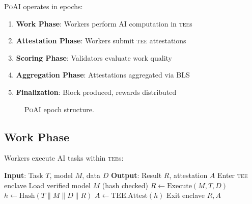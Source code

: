 \documentclass[11pt,letterpaper]{article}
\newcommand{\PoAI}{\textsc{PoAI}}
\newcommand{\TEE}{\textsc{tee}}
\begin{document}
\PoAI{} operates in epochs:

\begin{enumerate}
    \item \textbf{Work Phase}: Workers perform AI computation in \TEE{}s
    \item \textbf{Attestation Phase}: Workers submit \TEE{} attestations
    \item \textbf{Scoring Phase}: Validators evaluate work quality
    \item \textbf{Aggregation Phase}: Attestations aggregated via BLS
    \item \textbf{Finalization}: Block produced, rewards distributed
\end{enumerate}

\begin{figure}[t]
\centering
{}
\caption{\PoAI{} epoch structure.}
\label{fig:epoch}
\end{figure}

\subsection{Work Phase}

Workers execute AI tasks within \TEE{}s:

\begin{algorithm}[t]
\caption{Worker Execution}
\label{alg:worker}
\begin{algorithmic}[1]
\STATE \textbf{Input}: Task $T$, model $M$, data $D$
\STATE \textbf{Output}: Result $R$, attestation $A$
\STATE Enter \TEE{} enclave
\STATE Load verified model $M$ (hash checked)
\STATE $R \leftarrow \text{Execute}(M, T, D)$
\STATE $h \leftarrow \text{Hash}(T \| M \| D \| R)$
\STATE $A \leftarrow \text{TEE.Attest}(h)$
\STATE Exit enclave
\RETURN $R, A$
\end{algorithmic}
\end{algorithm}
\end{document}
